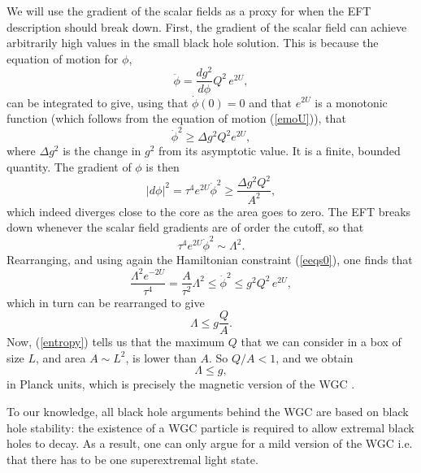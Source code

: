 \documentclass[11pt]{article}
\numberwithin{equation}{section}
\newcommand{\eq}[1]{(\ref{#1})}
\numberwithin{equation}{section}
\theoremstyle{remark}
\begin{document}
We will use the gradient of the scalar fields as a proxy for when the EFT description should break down. First, the gradient of the scalar field can achieve arbitrarily high values in the small black hole solution. This is because the equation of motion for $\phi$,
\begin{equation} \ddot{\phi}=\frac{dg^2}{d\phi} Q^2\,e^{2U},\end{equation}
can be integrated to give, using that $\dot{\phi}(0)=0$ and that $e^{2U}$ is a monotonic function (which follows from the equation of motion \eq{emoU}), that 
\begin{equation} \dot{\phi}^2\geq \Delta g^2 Q^2 e^{2U},\end{equation}
where $\Delta g^2$ is the change in $g^2$ from its asymptotic value. It is a finite, bounded quantity.
The gradient of $\phi$ is then 
\begin{equation} \vert d\phi\vert^2= \tau^4e^{2U} \dot{\phi}^2 \geq \frac{\Delta g^2 Q^2}{A^2},\end{equation}
which indeed diverges close to the core as the area goes to zero. The EFT breaks down whenever the scalar field gradients are of order the cutoff, so that
\begin{equation} \tau^4e^{2U} \dot{\phi}^2\sim \Lambda^2.\label{eww3}\end{equation}
Rearranging, and using again the Hamiltonian constraint \eq{eeqs0}, one finds that
\begin{equation} \frac{\Lambda^2e^{-2U}}{\tau^4}=\frac{A}{\tau^2}\Lambda^2\leq \dot{\phi}^2 \leq g^2 Q^2\, e^{2U},\end{equation}
which in turn can be rearranged to give
\begin{equation} \Lambda\leq g \frac{Q}{A}.\end{equation}
Now, \eq{entropy} tells us that the maximum $Q$ that we can consider in a box of size $L$, and area $A\sim L^2$, is lower than $A$. So $Q/A<1$, and we obtain 
\begin{equation} \Lambda\leq g,\end{equation}
in Planck units, which is precisely the magnetic version of the WGC \cite{Arkani-Hamed:2006emk}.

To our knowledge, all black hole arguments behind the WGC are based on black hole stability: the existence of a WGC particle is required to allow extremal black holes to decay. As a result, one can only argue for a mild version of the WGC \cite{ArkaniHamed:2005yv} i.e. that there has to be one superextremal light state. 
\end{document}
